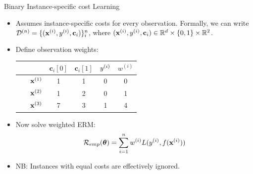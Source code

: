 \documentclass[11pt,compress,t,notes=noshow, xcolor=table]{beamer}
\newcommand{\cv}{\mathbf{c}}    %
\begin{document}
\begin{vbframe}{Binary Instance-specific cost Learning}
    \footnotesize
    \begin{itemize}
        \footnotesize
        \item Assumes instance-specific costs for every observation. Formally, we can write $\D^{(n)} = \{(\xi, \yi, \cv_i)\}_i^n$, where $(\xi, \yi, \cv_i) \in \mathbb{R}^d \times \{0,1\} \times \mathbb{R}^2$.
        
        \item Define observation weights: 

        \begin{center}
                            \begin{tabular}{cc|cccc}\
        			& & $\cv_i[0]$ & $\cv_i[1]$ & $y^{(i)}$ & $w^{(i)}$ \\
        			\hline & $\mathbf{x}^{(1)}$ & 1 & 1 & 0 & 0\\
        			& $\mathbf{x}^{(2)}$ & 1 & 2 & 0 & 1\\
        			& $\mathbf{x}^{(3)}$ & 7 & 3 & 1 & 4\\

                \end{tabular}
        \end{center}
        \item Now solve weighted ERM:
        \begin{equation*}
            \mathcal{R}_{emp}(\boldsymbol{\theta}) = \sum_{i=1}^{n}w^{(i)}L(y^{(i)},f(\mathbf{x}^{(i)}))
        \end{equation*}
        \item NB: Instances with equal costs are effectively ignored.
        \end{itemize}
            
\end{vbframe}
\end{document}
